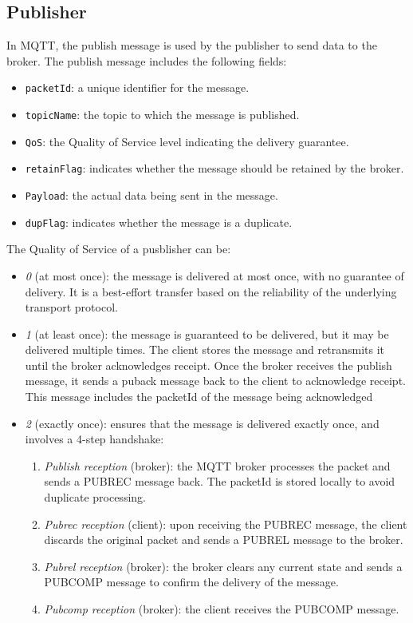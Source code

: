 \subsection{Publisher}
In MQTT, the publish message is used by the publisher to send data to the broker. 
The publish message includes the following fields:
\begin{itemize}
    \item \texttt{packetId}: a unique identifier for the message.
    \item \texttt{topicName}: the topic to which the message is published.
    \item \texttt{QoS}: the Quality of Service level indicating the delivery guarantee.
    \item \texttt{retainFlag}: indicates whether the message should be retained by the broker.
    \item \texttt{Payload}: the actual data being sent in the message.
    \item \texttt{dupFlag}: indicates whether the message is a duplicate.
\end{itemize}
\noindent The Quality of Service of a pusblisher can be: 
\begin{itemize}
    \item \textit{0} (at most once): the message is delivered at most once, with no guarantee of delivery. 
        It is a best-effort transfer based on the reliability of the underlying transport protocol.
    \item \textit{1} (at least once): the message is guaranteed to be delivered, but it may be delivered multiple times. 
        The client stores the message and retransmits it until the broker acknowledges receipt.
        Once the broker receives the publish message, it sends a puback message back to the client to acknowledge receipt. 
        This message includes the packetId of the message being acknowledged

    \item \textit{2} (exactly once): ensures that the message is delivered exactly once, and involves a 4-step handshake:
        \begin{enumerate}
            \item \textit{Publish reception} (broker): the MQTT broker processes the packet and sends a PUBREC message back. The packetId is stored locally to avoid duplicate processing.
            \item \textit{Pubrec reception} (client): upon receiving the PUBREC message, the client discards the original packet and sends a PUBREL message to the broker.
            \item \textit{Pubrel reception} (broker): the broker clears any current state and sends a PUBCOMP message to confirm the delivery of the message.
            \item \textit{Pubcomp reception} (broker): the client receives the PUBCOMP message.
        \end{enumerate}
\end{itemize}


